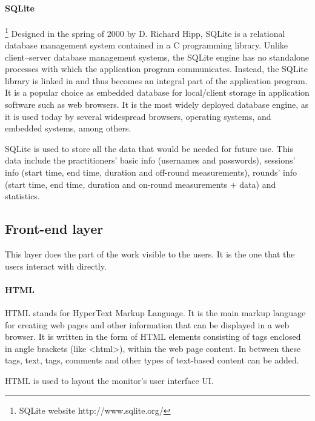 \paragraph{SQLite}\footnote{SQLite website http://www.sqlite.org/}
Designed in the spring of 2000 by D. Richard Hipp, SQLite is a relational database management system contained in a C programming library. Unlike client–server database management systems, the SQLite engine has no standalone processes with which the application program communicates. Instead, the SQLite library is linked in and thus becomes an integral part of the application program. It is a popular choice as embedded database for local/client storage in application software such as web browsers. It is the most widely deployed database engine, as it is used today by several widespread browsers, operating systems, and embedded systems, among others.

SQLite is used to store all the data that would be needed for future use. This data include the practitioners' basic info (usernames and passwords), sessions' info (start time, end time, duration and off-round measurements), rounds' info (start time, end time, duration and on-round measurements + data) and statistics.

\newpage

\subsection{Front-end layer}
This layer does the part of the work visible to the users. It is the one that the users interact with directly.

\paragraph{HTML}
HTML stands for HyperText Markup Language. It is the main markup language for creating web pages and other information that can be displayed in a web browser. It is written in the form of HTML elements consisting of tags enclosed in angle brackets (like <html>), within the web page content. In between these tags, text, tags, comments and other types of text-based content can be added.

HTML is used to layout the monitor's user interface UI.


